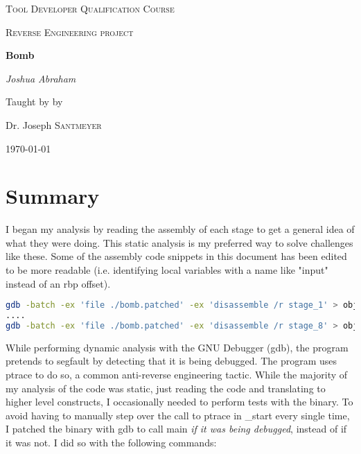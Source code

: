 \documentclass{article}
\begin{document}
\begin{titlepage}
	\centering
	{\scshape\LARGE Tool Developer Qualification Course\par}
	\vspace{1cm}
	{\scshape\Large Reverse Engineering project\par}
	\vspace{1.5cm}
	{\huge\bfseries Bomb\par}
	\vspace{2cm}
	{\Large\itshape Joshua Abraham\par}
	\vfill
	Taught by by\par
	Dr. Joseph \textsc{Santmeyer}
	\vfill
	{\large \today\par}
\end{titlepage}


\newpage
\tableofcontents
\newpage


\section{Summary}
\begin{flushleft}
\vspace{.5pc}
\end{flushleft}
\par
I began my analysis by reading the assembly of each stage to get a general
idea of what they were doing.  This static analysis is my preferred way to
solve challenges like these.  Some of the assembly code snippets in this
document has been edited to be more readable (i.e. identifying local 
variables with a name like "input" instead of an rbp offset).
\begin{lstlisting}[language=bash]
gdb -batch -ex 'file ./bomb.patched' -ex 'disassemble /r stage_1' > objectdumps/stage_1.out
....
gdb -batch -ex 'file ./bomb.patched' -ex 'disassemble /r stage_8' > objectdumps/stage_8.out
\end{lstlisting}

\par
While performing dynamic analysis with the GNU Debugger (gdb), the program 
pretends to segfault by detecting that it is being debugged.  The program 
uses ptrace to do so, a common anti-reverse engineering tactic.  While the
majority of my analysis of the code was static, just reading the code and
translating to higher level constructs, I occasionally needed to perform 
tests with the binary.  To avoid having to manually step over the call to 
ptrace in \_start every single time, I patched the binary with gdb to call
main \textit{if it was being debugged}, instead of if it was not.  I did so
with the following commands:
\end{document}
